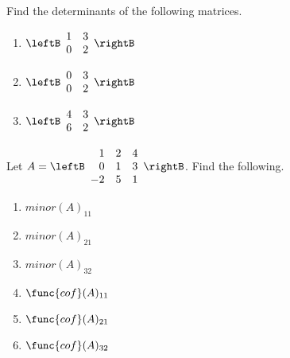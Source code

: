 \begin{enumialphparenastyle}

\begin{ex} Find the determinants of the following matrices.

\begin{enumerate}
\item $\leftB
\begin{array}{rr}
1 & 3 \\
0 & 2
\end{array}
\rightB$

\item $\leftB
\begin{array}{rr}
0 & 3 \\
0 & 2
\end{array}
\rightB$

\item $\leftB
\begin{array}{rr}
4 & 3 \\
6 & 2
\end{array}
\rightB$
\end{enumerate}
\end{ex}

\begin{ex} Let $A = \leftB \begin{array}{rrr}
1 & 2 & 4 \\
0 & 1 & 3 \\
-2 & 5 & 1 
\end{array} \rightB$. Find the following.
\begin{enumerate}
\item $minor(A)_{11}$
\item $minor(A)_{21}$
\item $minor(A)_{32}$
\item $\func{cof}(A)_{11}$
\item $\func{cof}(A)_{21}$
\item $\func{cof}(A)_{32}$
\end{enumerate}
\end{ex}


\end{enumialphparenastyle}
